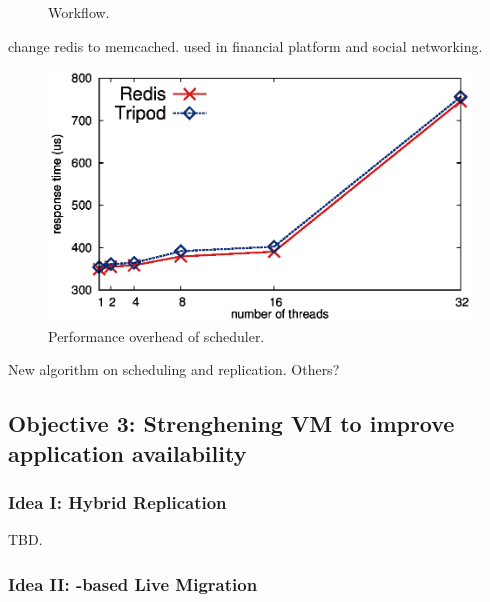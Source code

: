 \begin{figure}[!htb]
\begin{minipage}{0.51\textwidth}
        \vspace{0.1in}
        \caption{Workflow.}
        \label{fig:falcon-protocol}
    \end{minipage}
\end{figure}

 change redis to memcached. used in financial 
platform and social networking.

\begin{figure}[!htb]
\centering
\includegraphics[width=0.34\textheight]{figures/scheduler_latency.ps}
        \vspace{0.1in}
        \caption{Performance overhead of scheduler.}
        \label{fig:scalability}
\end{figure}

 New algorithm on scheduling and replication. Others?

\vspace{-.15in}\subsection{Objective 3: 
Strenghening VM to improve application 
availability}\label{sec:defense}\vspace{-.075in}


\vspace{-.15in}\subsubsection{Idea I: Hybrid Replication} 
\label{sec:defense-arch}\vspace{-.075in}

TBD.

\vspace{-.15in}\subsubsection{Idea II: \paxos-based Live Migration} 
\label{sec:defense-arch}\vspace{-.075in}

